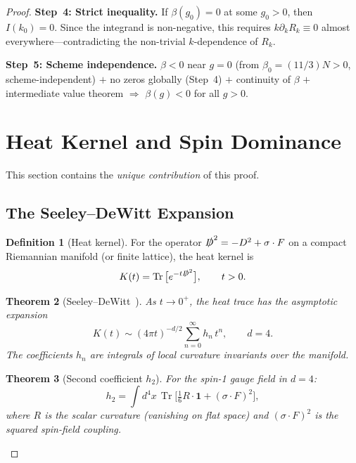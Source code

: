 \documentclass[12pt,a4paper]{article}
\theoremstyle{plain}
\newtheorem{theorem}{Theorem}[section]
\theoremstyle{definition}
\newtheorem{definition}[theorem]{Definition}
\theoremstyle{remark}
\begin{document}
\begin{proof}
\textbf{Step~4: Strict inequality.} If $\beta(g_0)=0$ at some $g_0>0$, then $I(k_0)=0$. Since the integrand is non-negative, this requires $k\partial_kR_k\equiv 0$ almost everywhere---contradicting the non-trivial $k$-dependence of $R_k$.

\textbf{Step~5: Scheme independence.} $\beta<0$ near $g=0$ (from $\beta_0=(11/3)N>0$, scheme-independent) $+$ no zeros globally (Step~4) $+$ continuity of $\beta$ $+$ intermediate value theorem $\Rightarrow$ $\beta(g)<0$ for all $g>0$.

\section{Heat Kernel and Spin Dominance}\label{sec:heat}

This section contains the \emph{unique contribution} of this proof.

\subsection{The Seeley--DeWitt Expansion}\label{sec:SD}

\begin{definition}[Heat kernel]\label{def:heat}
For the operator $\slashed{D}^2=-D^2+\sigma\cdot F$ on a compact Riemannian manifold (or finite lattice), the heat kernel is
\begin{equation}\label{eq:heat}
K(t) = \operatorname{Tr}\big[e^{-t\slashed{D}^2}\big], \qquad t>0.
\end{equation}
\end{definition}

\begin{theorem}[Seeley--DeWitt~\cite{Gilkey1995}]\label{thm:SD}
As $t\to 0^+$, the heat trace has the asymptotic expansion
\begin{equation}\label{eq:SD}
K(t) \sim (4\pi t)^{-d/2}\sum_{n=0}^{\infty} h_n\,t^n, \qquad d=4.
\end{equation}
The coefficients $h_n$ are integrals of local curvature invariants over the manifold.
\end{theorem}

\begin{theorem}[Second coefficient $h_2$]\label{thm:h2}
For the spin-1 gauge field in $d=4$:
\begin{equation}\label{eq:h2}
h_2 = \int d^4x\,\operatorname{Tr}\Big[\tfrac{1}{6}R\cdot\mathbf{1} + (\sigma\cdot F)^2\Big],
\end{equation}
where $R$ is the scalar curvature (vanishing on flat space) and $(\sigma\cdot F)^2$ is the squared spin-field coupling.
\end{theorem}


\end{proof}
\end{document}
